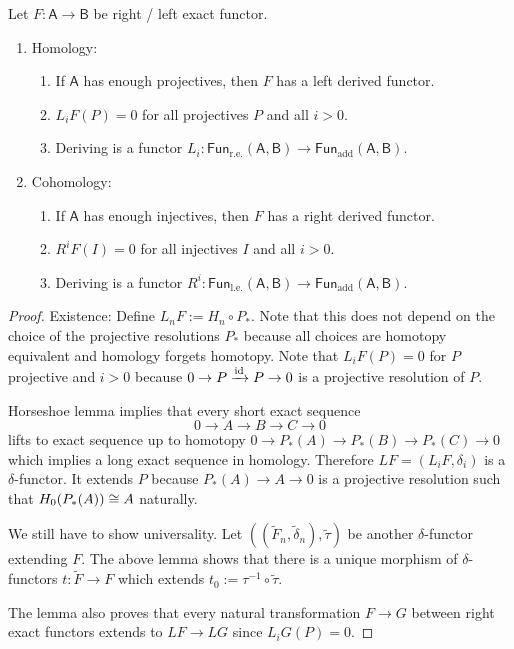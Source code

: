 \documentclass[fontsize=11pt,fleqn,a4paper]{scrartcl}
\begin{document}
\begin{theorem}
Let $F:\mathsf{A}\to\mathsf{B}$ be right / left exact functor.
\begin{multicols}{2}
\begin{enumerate}
\item Homology:
\begin{enumerate}
\item If $\mathsf{A}$ has enough projectives, then $F$ has a left derived functor.
\item $L_i F(P) = 0$ for all projectives $P$ and all $i>0$.
\item Deriving is a functor $L_i: \mathsf{Fun}_\text{r.e.}(\mathsf{A},\mathsf{B}) \to \mathsf{Fun}_\text{add}(\mathsf{A},\mathsf{B})$.
\end{enumerate}
\item Cohomology:
\begin{enumerate}
\item If $\mathsf{A}$ has enough injectives, then $F$ has a right derived functor.
\item $R^i F(I) = 0$ for all injectives $I$ and all $i>0$.
\item Deriving is a functor $R^i: \mathsf{Fun}_\text{l.e.}(\mathsf{A},\mathsf{B}) \to \mathsf{Fun}_\text{add}(\mathsf{A},\mathsf{B})$.
\end{enumerate}
\end{enumerate}
\end{multicols}
\end{theorem}
\begin{proof}
Existence: Define $L_nF := H_n \circ P_\ast$. Note that this does not depend on the choice of the projective resolutions $P_\ast$ because all choices are homotopy equivalent and homology forgets homotopy. Note that $L_i F(P) = 0$ for $P$ projective and $i>0$ because $0\to P\xrightarrow{\operatorname{id}} P \to 0$ is a projective resolution of $P$.

\medbreak
Horseshoe lemma implies that every short exact sequence
\[0\to A\to B\to C\to 0\]
lifts to exact sequence up to homotopy $0\to P_\ast(A) \to P_\ast(B) \to P_\ast(C)\to 0$ which implies a long exact sequence in homology. Therefore $LF=(L_i F,\delta_i)$ is a $\delta$-functor. It extends $P$ because $P_\ast(A)\to A\to 0$ is a projective resolution such that $H_0(P_\ast(A)) \cong A$ naturally.

\medbreak
We still have to show universality. Let $((\tilde{F}_n,\tilde{\delta}_n), \tilde{\tau})$ be another $\delta$-functor extending $F$. The above lemma shows that there is a unique morphism of $\delta$-functors $t: \tilde{F}\to F$ which extends $t_0 := \tau^{-1}\circ\tilde{\tau}$.

\medbreak
The lemma also proves that every natural transformation $F\to G$ between right exact functors extends to $LF \to LG$ since $L_iG(P) = 0$.
\end{proof}
\end{document}
